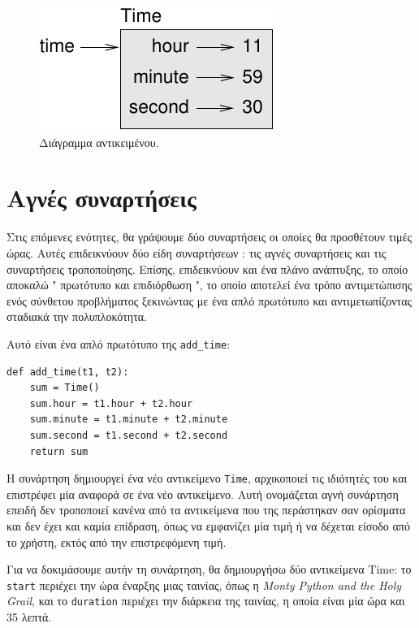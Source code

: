\documentclass[10pt]{book}
\begin{document}
\begin{figure}
\centerline
{\includegraphics[scale=0.8]{figs/time.pdf}}
 \caption{Διάγραμμα αντικειμένου.}  
\label{fig.time}
\end{figure}


 
\section{Αγνές συναρτήσεις}

Στις επόμενες ενότητες, θα γράψουμε δύο συναρτήσεις οι οποίες θα προσθέτουν τιμές ώρας.  Αυτές επιδεικνύουν δύο είδη συναρτήσεων :  τις αγνές συναρτήσεις και τις συναρτήσεις τροποποίησης.  Επίσης, επιδεικνύουν και ένα πλάνο ανάπτυξης, το οποίο αποκαλώ  " πρωτότυπο και επιδιόρθωση ",  το οποίο αποτελεί ένα τρόπο αντιμετώπισης ενός σύνθετου προβλήματος ξεκινώντας με ένα απλό πρωτότυπο και αντιμετωπίζοντας σταδιακά την πολυπλοκότητα.

Αυτό είναι ένα απλό πρωτότυπο της  \verb"add_time":

\begin{verbatim}
def add_time(t1, t2):
    sum = Time()
    sum.hour = t1.hour + t2.hour
    sum.minute = t1.minute + t2.minute
    sum.second = t1.second + t2.second
    return sum
\end{verbatim}
%
 Η συνάρτηση δημιουργεί ένα νέο αντικείμενο  {\tt Time},  αρχικοποιεί τις ιδιότητές του και επιστρέφει μία αναφορά 
σε ένα νέο αντικείμενο.  Αυτή ονομάζεται αγνή συνάρτηση επειδή δεν τροποποιεί κανένα από τα αντικείμενα που της περάστηκαν σαν 
ορίσματα και δεν έχει και καμία επίδραση, όπως να εμφανίζει μία τιμή ή να δέχεται είσοδο από το χρήστη, εκτός από την επιστρεφόμενη 
τιμή.

Για να δοκιμάσουμε αυτήν τη συνάρτηση, θα δημιουργήσω δύο αντικείμενα  Time:  το  {\tt start}  περιέχει την ώρα έναρξης 
μιας ταινίας, όπως η  {\em Monty Python and the Holy Grail},  και το  {\tt duration}  περιέχει την διάρκεια της ταινίας, η οποία είναι μία ώρα και 35 λεπτά.
\end{document}
